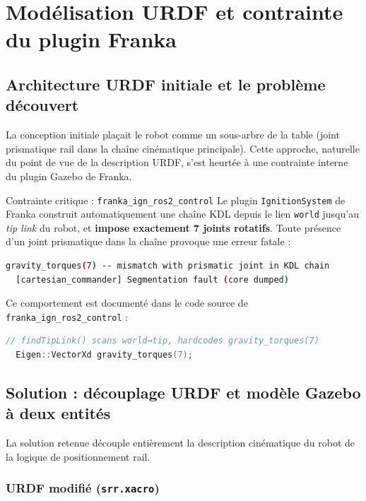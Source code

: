 \documentclass[11pt, a4paper]{article}
\newcommand{\file}[1]{\texttt{\color{AccentTeal}#1}}
\begin{document}
\section{Modélisation URDF et contrainte du plugin Franka}

\subsection{Architecture URDF initiale et le problème découvert}

La conception initiale plaçait le robot comme un sous-arbre de la table (joint prismatique rail dans la chaîne cinématique principale). Cette approche, naturelle du point de vue de la description URDF, s'est heurtée à une contrainte interne du plugin Gazebo de Franka.

\begin{warnbox}{Contrainte critique : \texttt{franka\_ign\_ros2\_control}}
Le plugin \texttt{IgnitionSystem} de Franka construit automatiquement une chaîne KDL depuis le lien \texttt{world} jusqu'au \textit{tip link} du robot, et \textbf{impose exactement 7 joints rotatifs}. Toute présence d'un joint prismatique dans la chaîne provoque une erreur fatale :
\begin{lstlisting}[language=bash, numbers=none]
  gravity_torques(7) -- mismatch with prismatic joint in KDL chain
  [cartesian_commander] Segmentation fault (core dumped)
\end{lstlisting}
Ce comportement est documenté dans le code source de \texttt{franka\_ign\_ros2\_control} :
\begin{lstlisting}[language=cpp, numbers=none]
  // findTipLink() scans world→tip, hardcodes gravity_torques(7)
  Eigen::VectorXd gravity_torques(7);
\end{lstlisting}
\end{warnbox}

\subsection{Solution : découplage URDF et modèle Gazebo à deux entités}

La solution retenue découple entièrement la description cinématique du robot de la logique de positionnement rail.

\subsubsection{URDF modifié (\file{srr.xacro})}
\end{document}
